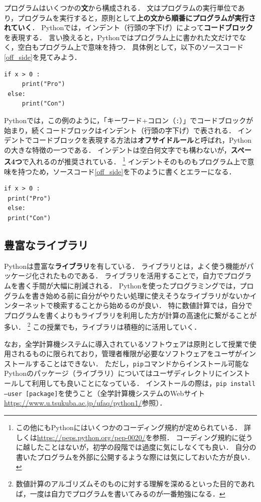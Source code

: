 \documentclass[a4paper,12pt]{jsarticle}
\begin{document}
プログラムはいくつかの{\bf 文}から構成される．
文はプログラムの実行単位であり，プログラムを実行すると，原則として{\bf 上の文から順番にプログラムが実行されていく}．
Pythonでは，インデント（行頭の字下げ）によって{\bf コードブロック}を表現する．
言い換えると，Pythonではプログラム上に書かれた文だけでなく，空白もプログラム上で意味を持つ．
具体例として，以下のソースコード\ref{off_side}を見てみよう．
\begin{lstlisting}[caption=インデントによるコードブロックの表現,label=off_side]
 if x > 0 :
     print("Pro")
 else:
     print("Con")
\end{lstlisting}
Pythonでは，この例のように，「キーワード+コロン（\texttt{:}）」でコードブロックが始まり，続くコードブロックはインデント（行頭の字下げ）で表される．
インデントでコードブロックを表現する方法は{\bf オフサイドルール}と呼ばれ，Pythonの大きな特徴の一つである．
インデントは空白何文字でも構わないが，{\bf スペース4つ}で入れるのが推奨されている．
\footnote{
この他にもPythonにはいくつかのコーディング規約が定められている．
詳しくは\url{https://peps.python.org/pep-0020/}を参照．
コーディング規約に従うに越したことはないが，初学の段階では過度に気にしなくても良い．
自分の書いたプログラムを外部に公開するような際には気にしておいた方が良い．
}
インデントそのものもプログラム上で意味を持つため，ソースコード\ref{off_side}を下のように書くとエラーになる．
\begin{lstlisting}[caption=インデントに起因してエラーとなる例,label=off_side_error]
 if x > 0 :
 print("Pro")
 else:
 print("Con")
\end{lstlisting}


\subsection{豊富なライブラリ}

Pythonは豊富な{\bf ライブラリ}を有している．
ライブラリとは，よく使う機能がパッケージ化されたものである．
ライブラリを活用することで，自力でプログラムを書く手間が大幅に削減される．
Pythonを使ったプログラミングでは，プログラムを書き始める前に自分がやりたい処理に使えそうなライブラリがないかインターネットで検索することから始めるのが良い．
特に数値計算では，自分でプログラムを書くよりもライブラリを利用した方が計算の高速化に繋がることが多い．
\footnote{
数値計算のアルゴリズムそのものに対する理解を深めるといった目的であれば，一度は自力でプログラムを書いてみるのが一番勉強になる．
}
この授業でも，ライブラリは積極的に活用していく．

なお，全学計算機システムに導入されているソフトウェアは原則として授業で使用されるものに限られており，管理者権限が必要なソフトウェアをユーザがインストールすることはできない．
ただし，\texttt{pip}コマンドからインストール可能なPythonのパッケージ（ライブラリ）についてはユーザディレクトリにインストールして利用しても良いことになっている．
インストールの際は，\texttt{pip install --user [package]}を使うこと（全学計算機システムのWebサイト\url{https://www.u.tsukuba.ac.jp/ufaq/python1/}参照）．
\end{document}
